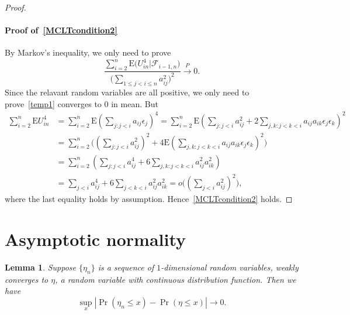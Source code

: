 \documentclass[review]{elsarticle}
\theoremstyle{plain}
\newtheorem{lemma}{Lemma}
\theoremstyle{definition}
\theoremstyle{remark}
\begin{document}
\begin{proof}
     \paragraph{Proof of~\eqref{MCLTcondition2}}
     By Markov's inequality, we only need to prove
     \begin{equation}\label{temp1}
         \frac{\sum_{i=2}^n \mathrm{E}\big(U_{in}^4\big|\mathcal{F}_{i-1,n}\big)}{{\big(\sum_{1\leq j<i\leq n} a_{ij}^2\big)}^2}\xrightarrow{P} 0.
     \end{equation}
     Since the relavant random variables are all positive, we only need to prove~\eqref{temp1} converges to $0$ in mean. But
     \begin{equation*}
         \begin{aligned}
         \sum_{i=2}^n \mathrm{E} U_{in}^4
             &=
             \sum_{i=2}^n \mathrm{E} {(\sum_{j:j<i}a_{ij}\epsilon_j)}^4
             =
             \sum_{i=2}^n \mathrm{E} {(\sum_{j:j<i}a_{ij}^2+2\sum_{j,k:j<k<i}a_{ij}a_{ik}\epsilon_j \epsilon_k)}^2\\
             &=
             \sum_{i=2}^n  \big({(\sum_{j:j<i}a_{ij}^2)}^2+4\mathrm{E}{(\sum_{j,k:j<k<i}a_{ij}a_{ik}\epsilon_j \epsilon_k)}^2 \big)\\
             &=
             \sum_{i=2}^n  (\sum_{j:j<i}a_{ij}^4+6\sum_{j,k:j<k<i}a_{ij}^2 a_{ik}^2)\\
             &=
             \sum_{j<i}a_{ij}^4+6\sum_{j<k<i}a_{ij}^2 a_{ik}^2
             =
             o\big({(\sum_{j<i} a_{ij}^2)}^2\big),
         \end{aligned}
     \end{equation*}
     where the last equality holds by assumption. Hence~\eqref{MCLTcondition2} holds.
 \end{proof}

\section{Asymptotic normality}
\begin{lemma}\label{lemmaUniformSimple}
    Suppose $\{\eta_n\}$ is a sequence of $1$-dimensional random variables, weakly converges to $\eta$, a random variable with continuous distribution function.
    Then we have
    $$
    \sup_{x}|\Pr(\eta_n\leq x)-\Pr(\eta\leq x)|\to 0.
    $$
\end{lemma}
\end{document}
